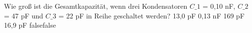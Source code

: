     {Wie groß ist die Gesamtkapazität, wenn drei Kondensatoren $C\_1$ = 0,10 nF, $C\_2$ = 47 pF und $C\_3$ = 22 pF in Reihe geschaltet werden?}
    {13,0 pF}
    {0,13 nF}
    {169 pF}
    {16,9 pF}
    {false}{false}
